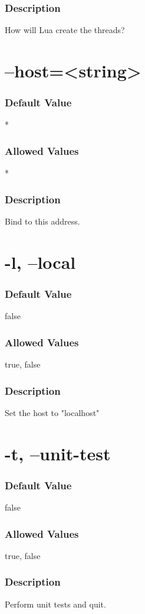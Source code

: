 \documentclass[a4paper,11pt]{report}
\begin{document}
\subsubsection{Description}{How will Lua create the threads?}

\section{--host=<string>}
\subsubsection{Default Value}{*}
\subsubsection{Allowed Values}{*}
\subsubsection{Description}{Bind to this address.}

\section{-l, --local}
\subsubsection{Default Value}{false}
\subsubsection{Allowed Values}{true, false}
\subsubsection{Description}{Set the host to "localhost"}

\section{-t, --unit-test}
\subsubsection{Default Value}{false}
\subsubsection{Allowed Values}{true, false}
\subsubsection{Description}{Perform unit tests and quit.}
\end{document}
